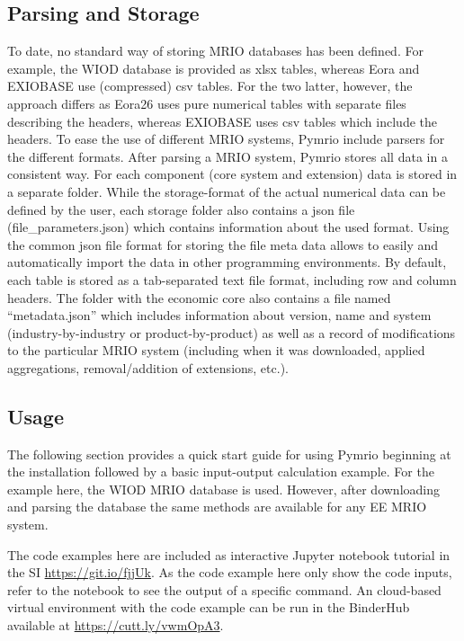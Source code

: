 \documentclass{jors}
\begin{document}
\subsection*{Parsing and Storage}

To date, no standard way of storing MRIO databases has been defined.
For example, the WIOD database \cite{timmer2015_Illustrated} is provided as xlsx tables, whereas Eora \cite{lenzen2013_Building} and EXIOBASE \cite{stadler2018_EXIOBASE} use (compressed) csv tables.
For the two latter, however, the approach differs as Eora26 uses pure numerical tables with separate files describing the headers, whereas EXIOBASE uses csv tables which include the headers.
To ease the use of different MRIO systems, Pymrio include parsers for the different formats.
After parsing a MRIO system, Pymrio stores all data in a consistent way.
For each component (core system and extension) data is stored in a separate folder.
While the storage-format of the actual numerical data can be defined by the user, each storage folder also contains a json file (file\_parameters.json) which contains information about the used format. 
Using the common json file format for storing the file meta data  allows to easily and automatically import the data in other programming environments. 
By default, each table is stored as a tab-separated text file format, including row and column headers.
The folder with the economic core also contains a file named ``metadata.json'' which includes information about version, name and system (industry-by-industry or product-by-product) as well as a record of modifications to the particular MRIO system (including when it was downloaded, applied aggregations, removal/addition of extensions, etc.). 

\subsection*{Usage}

The following section provides a quick start guide for using Pymrio beginning at the installation followed by a basic input-output calculation example.
For the example here, the WIOD MRIO database \cite{timmer2015_Illustrated} is used. 
However, after downloading and parsing the database the same methods are available for any EE MRIO system.

The code examples here are included as interactive Jupyter notebook tutorial in the SI \url{https://git.io/fjjUk}.
As the code example here only show the code inputs, refer to the notebook to see the output of a specific command. 
An cloud-based virtual environment with the code example can be run in the BinderHub available at \url{https://cutt.ly/vwmOpA3}. 
\end{document}
